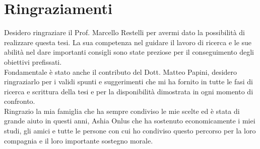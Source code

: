 
\bigskip

\begingroup
\let\clearpage\relax
\let\cleardoublepage\relax
\let\cleardoublepage\relax
\chapter*{Ringraziamenti}
Desidero ringraziare il Prof. Marcello Restelli per avermi dato la possibilità di realizzare questa tesi. La sua competenza nel guidare il lavoro di ricerca e le sue abilità nel dare importanti consigli sono state preziose per il conseguimento degli obiettivi prefissati.\\
\newline
Fondamentale è stato anche il contributo del Dott. Matteo Papini, desidero ringraziarlo per i validi spunti e suggerimenti che mi ha fornito in tutte le fasi di ricerca e scrittura della tesi e per la disponibilità dimostrata in ogni momento di confronto.\\
\newline
Ringrazio la mia famiglia che ha sempre condiviso le mie scelte ed è stata di grande aiuto in questi anni, Ashia Onlus che ha sostenuto economicamente i miei studi, gli amici e tutte le persone con cui ho condiviso questo percorso per la loro compagnia e il loro importante sostegno morale.

\endgroup